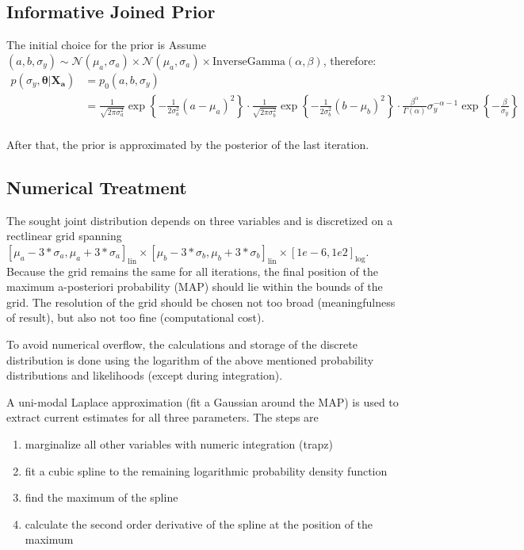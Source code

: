 \documentclass[10pt]{article}
\renewcommand{\vec}[1]{\boldsymbol{#1}}
\begin{document}
\subsection{Informative Joined Prior}
The initial choice for the prior is
\label{sec:initial_informative_prior}
Assume $(a,b,\sigma_y) \sim \mathcal{N}(\mu_a, \sigma_a) \times \mathcal{N}(\mu_a, \sigma_a) \times \text{InverseGamma}(\alpha, \beta) $, therefore:
\begin{align}
    p(\sigma_y, \vec{\theta} | \vec{X_a}) &= p_0(a, b, \sigma_y) \\
    &= 
    \frac{1}{\sqrt{2 \pi \sigma_{a}^2}} \exp\left\{ - \frac{1}{2\sigma_{a}^2} ( a - \mu_{a} )^2 \right\} \cdot 
    \frac{1}{\sqrt{2 \pi \sigma_{b}^2}} \exp\left\{ - \frac{1}{2\sigma_{b}^2} ( b - \mu_{b} )^2 \right\} \cdot
    \frac{\beta^{\alpha}}{\Gamma(\alpha)} \sigma_y^{-\alpha-1} \exp\left\{ - \frac{\beta}{\sigma_y} \right\} \\ 
\end{align}

After that, the prior is approximated by the posterior of the last iteration.

\subsection{Numerical Treatment}
The sought joint distribution depends on three variables and is discretized on a rectlinear grid spanning 
$
    [\mu_a - 3 * \sigma_a, \mu_a + 3 * \sigma_a]_{\text{lin}} \times 
    [\mu_b - 3 * \sigma_b, \mu_b + 3 * \sigma_b]_{\text{lin}} \times 
    [1e-6, 1e2]_{\text{log}}
$. 
Because the grid remains the same for all iterations, the final position of the maximum a-posteriori probability (MAP) should lie within the bounds of the grid.
The resolution of the grid should be chosen not too broad (meaningfulness of result), but also not too fine (computational cost).

To avoid numerical overflow, the calculations and storage of the discrete distribution is done using the logarithm of the above mentioned probability distributions and likelihoods (except during integration).

A uni-modal Laplace approximation (fit a Gaussian around the MAP) is used to extract current estimates for all three parameters. 
The steps are
\begin{enumerate}
    \item marginalize all other variables with numeric integration (trapz)
    \item fit a cubic spline to the remaining logarithmic probability density function
    \item find the maximum of the spline
    \item calculate the second order derivative of the spline at the position of the maximum
\end{enumerate}
\end{document}
